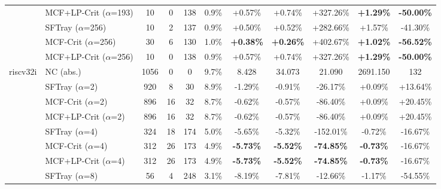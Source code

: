 \begin{table}[t]
{\begin{tabular}{ll|cccc|ccc|cc}
 & MCF+LP-Crit ($\alpha$=193) & 10 & 0 & 138 & 0.9\% & +0.57\% & +0.74\% & +327.26\% & \textbf{+1.29\%} & \textbf{-50.00\%} \\

\addlinespace[0.5em]

 & SFTray ($\alpha$=256) & 10 & 2 & 137 & 0.9\% & +0.50\% & +0.52\% & +282.66\% & +1.57\% & -41.30\% \\

 & MCF-Crit ($\alpha$=256) & 30 & 6 & 130 & 1.0\% & \textbf{+0.38\%} & \textbf{+0.26\%} & +402.67\% & \textbf{+1.02\%} & \textbf{-56.52\%} \\

 & MCF+LP-Crit ($\alpha$=256) & 10 & 0 & 138 & 0.9\% & +0.57\% & +0.74\% & +327.26\% & \textbf{+1.29\%} & \textbf{-50.00\%} \\

\midrule

\multirow{25}{*}{riscv32i} & NC (abs.) & 1056 & 0 & 0 & 9.7\% & 8.428 & 34.073 & 21.090 & 2691.150 & 132 \\

\addlinespace[0.4em]

 & SFTray ($\alpha$=2) & 920 & 8 & 30 & 8.9\% & -1.29\% & -0.91\% & -26.17\% & +0.09\% & +13.64\% \\

 & MCF-Crit ($\alpha$=2) & 896 & 16 & 32 & 8.7\% & -0.62\% & -0.57\% & -86.40\% & +0.09\% & +20.45\% \\

 & MCF+LP-Crit ($\alpha$=2) & 896 & 16 & 32 & 8.7\% & -0.62\% & -0.57\% & -86.40\% & +0.09\% & +20.45\% \\

\addlinespace[0.5em]

 & SFTray ($\alpha$=4) & 324 & 18 & 174 & 5.0\% & -5.65\% & -5.32\% & -152.01\% & -0.72\% & -16.67\% \\

 & MCF-Crit ($\alpha$=4) & 312 & 26 & 173 & 4.9\% & \textbf{-5.73\%} & \textbf{-5.52\%} & \textbf{-74.85\%} & \textbf{-0.73\%} & -16.67\% \\

 & MCF+LP-Crit ($\alpha$=4) & 312 & 26 & 173 & 4.9\% & \textbf{-5.73\%} & \textbf{-5.52\%} & \textbf{-74.85\%} & \textbf{-0.73\%} & -16.67\% \\

\addlinespace[0.5em]

 & SFTray ($\alpha$=8) & 56 & 4 & 248 & 3.1\% & -8.19\% & -7.81\% & -12.66\% & -1.17\% & -54.55\% \\


\end{tabular}}
\end{table}

